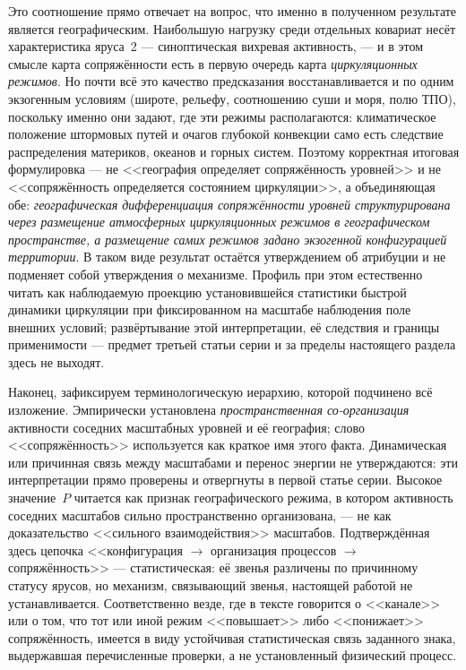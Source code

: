 \documentclass[11pt,a4paper]{article}
\begin{document}
Это соотношение прямо отвечает на вопрос, что именно в полученном результате является географическим. Наибольшую нагрузку среди отдельных ковариат несёт характеристика яруса~2 --- синоптическая вихревая активность, --- и в этом смысле карта сопряжённости есть в первую очередь карта \emph{циркуляционных режимов}. Но почти всё это качество предсказания восстанавливается и по одним экзогенным условиям (широте, рельефу, соотношению суши и моря, полю ТПО), поскольку именно они задают, где эти режимы располагаются: климатическое положение штормовых путей и очагов глубокой конвекции само есть следствие распределения материков, океанов и горных систем. Поэтому корректная итоговая формулировка --- не <<география определяет сопряжённость уровней>> и не <<сопряжённость определяется состоянием циркуляции>>, а объединяющая обе: \emph{географическая дифференциация сопряжённости уровней структурирована через размещение атмосферных циркуляционных режимов в географическом пространстве, а размещение самих режимов задано экзогенной конфигурацией территории}. В таком виде результат остаётся утверждением об атрибуции и не подменяет собой утверждения о механизме. Профиль при этом естественно читать как наблюдаемую проекцию установившейся статистики быстрой динамики циркуляции при фиксированном на масштабе наблюдения поле внешних условий; развёртывание этой интерпретации, её следствия и границы применимости --- предмет третьей статьи серии и за пределы настоящего раздела здесь не выходят.

Наконец, зафиксируем терминологическую иерархию, которой подчинено всё изложение. Эмпирически установлена \emph{пространственная со-организация} активности соседних масштабных уровней и её география; слово <<сопряжённость>> используется как краткое имя этого факта. Динамическая или причинная связь между масштабами и перенос энергии не утверждаются: эти интерпретации прямо проверены и отвергнуты в первой статье серии. Высокое значение~$P$ читается как признак географического режима, в котором активность соседних масштабов сильно пространственно организована, --- не как доказательство <<сильного взаимодействия>> масштабов. Подтверждённая здесь цепочка <<конфигурация $\to$ организация процессов $\to$ сопряжённость>> --- статистическая: её звенья различены по причинному статусу ярусов, но механизм, связывающий звенья, настоящей работой не устанавливается. Соответственно везде, где в тексте говорится о <<канале>> или о том, что тот или иной режим <<повышает>> либо <<понижает>> сопряжённость, имеется в виду устойчивая статистическая связь заданного знака, выдержавшая перечисленные проверки, а не установленный физический процесс.
\end{document}
